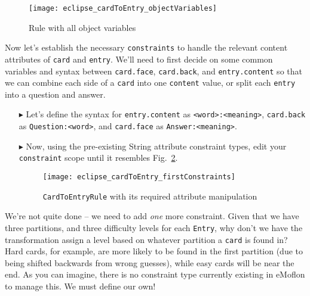 \begin{itemize}
\newpage

\begin{figure}[htb]
\begin{center}
  \texttt{[image: eclipse\_cardToEntry\_objectVariables]}
  \caption{Rule with all object variables}
  \label{eclipse:c2eAllReferences}
\end{center}
\end{figure}

\end{itemize}

Now let's establish the necessary \texttt{constraints} to handle the relevant content attributes of \texttt{card} and \texttt{entry}. We'll need to
first decide on some common variables and syntax between \texttt{card.face}, \texttt{card.back}, and \texttt{entry.content} so that we can combine each side of
a \texttt{card} into one \texttt{content} value, or split each \texttt{entry} into a question and answer. 

\begin{itemize}

\item[$\blacktriangleright$] Let's define the syntax for \texttt{entry.content} as \texttt{<word>:<mean\-ing>}, \texttt{card\-.back} as
\texttt{Quest\-ion:<word>}, and \texttt{card.face} as \texttt{Answer:<mean\-ing>}. 

\vspace{0.5cm}

\item[$\blacktriangleright$] Now, using the pre-existing String attribute constraint types, edit your \texttt{constraint} scope until it resembles
Fig.~\ref{eclipse:contentConstraints}.

\begin{figure}[htbp]
\begin{center}
  \texttt{[image: eclipse\_cardToEntry\_firstConstraints]}
  \caption{\texttt{CardToEntryRule} with its required attribute manipulation}
  \label{eclipse:contentConstraints}
\end{center}
\end{figure}

\end{itemize}

\newpage

We're not quite done -- we need to add \emph{one} more constraint. Given that we have three partitions, and three difficulty levels for each \texttt{Entry}, why
don't we have the transformation assign a level based on whatever partition a \texttt{card} is found in? Hard cards, for example, are more likely to be found in the first
partition (due to being shifted backwards from wrong guesses), while easy cards will be near the end.  As you can imagine, there is no constraint type currently
existing in eMoflon to manage this. We must define our own!

